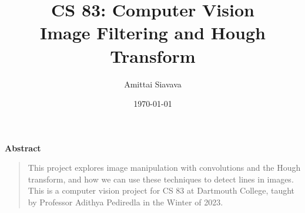 \title{
  \Huge{CS 83: Computer Vision}\\
  Image Filtering and Hough Transform
}
\date{\Large{\today}}

\begin{titlingpage}

  \author{\Large{Amittai Siavava}}
  \maketitle

  \step
  \begin{center}
    \textbf{Abstract}
  \end{center}
  \step
  \begin{quote}
    \small
    This project explores image manipulation
    with convolutions and the Hough transform,
    and how we can use these techniques to detect lines in images.
    This is a computer vision project for CS 83 at Dartmouth College,
    taught by Professor Adithya Pediredla in the Winter of 2023.

  \end{quote}

  \tableofcontents
\end{titlingpage}
